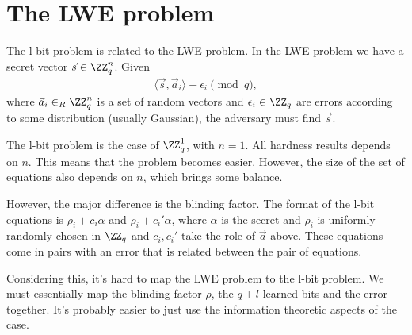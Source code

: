 \mode*

\section{The \acl*{LWE} problem}

The l-bit problem is related to the \ac{LWE} problem.
In the \ac{LWE} problem we have a secret vector \(\vec s \in \ZZ_q^n\).
Given
\begin{align*}
  \langle \vec s, \vec a_i\rangle + \epsilon_i \pmod q,
\end{align*}
where \(\vec a_i \in_R \ZZ_q^n\) is a set of random vectors and \(\epsilon_i 
\in \ZZ_q\) are errors according to some distribution (usually Gaussian), the 
adversary must find \(\vec s\).

The l-bit problem is the case of \(\ZZ_q^1\), \ie with \(n = 1\).
All hardness results depends on \(n\).
This means that the problem becomes easier.
However, the size of the set of equations also depends on \(n\), which brings 
some balance.

However, the major difference is the blinding factor.
The format of the l-bit equations is \(\rho_i + c_i\alpha\) and \(\rho_i + 
c_i'\alpha\), where \(\alpha\) is the secret and \(\rho_i\) is uniformly 
randomly chosen in \(\ZZ_q\) and \(c_i, c_i'\) take the role of \(\vec a\) 
above.
These equations come in pairs with an error that is related between the pair of 
equations.

Considering this, it's hard to map the \ac{LWE} problem to the l-bit problem.
We must essentially map the blinding factor \(\rho\), the \(q+l\) learned bits 
and the error together.
It's probably easier to just use the information theoretic aspects of the case.
